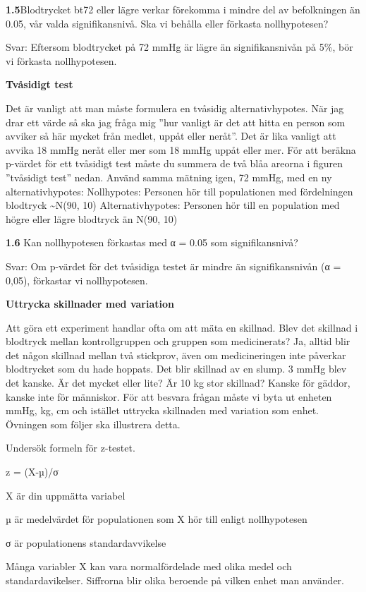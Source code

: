 \documentclass[
  letterpaper,
  DIV=11,
  numbers=noendperiod]{scrartcl}
\begin{document}
\textbf{1.5}Blodtrycket bt72 eller lägre verkar förekomma i mindre del
av befolkningen än 0.05, vår valda signifikansnivå. Ska vi behålla eller
förkasta nollhypotesen?

Svar: Eftersom blodtrycket på 72 mmHg är lägre än signifikansnivån på
5\%, bör vi förkasta nollhypotesen.

\textbf{Tvåsidigt test}

Det är vanligt att man måste formulera en tvåsidig alternativhypotes.
När jag drar ett värde så ska jag fråga mig ''hur vanligt är det att
hitta en person som avviker så här mycket från medlet, uppåt eller
neråt''. Det är lika vanligt att avvika 18 mmHg neråt eller mer som 18
mmHg uppåt eller mer. För att beräkna p-värdet för ett tvåsidigt test
måste du summera de två blåa areorna i figuren ''tvåsidigt test'' nedan.
Använd samma mätning igen, 72 mmHg, med en ny alternativhypotes:
Nollhypotes: Personen hör till populationen med fördelningen blodtryck
\textasciitilde N(90, 10) Alternativhypotes: Personen hör till en
population med högre eller lägre blodtryck än N(90, 10)

\textbf{1.6} Kan nollhypotesen förkastas med α = 0.05 som
signifikansnivå?

Svar: Om p-värdet för det tvåsidiga testet är mindre än signifikansnivån
(α = 0,05), förkastar vi nollhypotesen.

\textbf{Uttrycka skillnader med variation}

Att göra ett experiment handlar ofta om att mäta en skillnad. Blev det
skillnad i blodtryck mellan kontrollgruppen och gruppen som
medicinerats? Ja, alltid blir det någon skillnad mellan två stickprov,
även om medicineringen inte påverkar blodtrycket som du hade hoppats.
Det blir skillnad av en slump. 3 mmHg blev det kanske. Är det mycket
eller lite? Är 10 kg stor skillnad? Kanske för gäddor, kanske inte för
människor. För att besvara frågan måste vi byta ut enheten mmHg, kg, cm
och istället uttrycka skillnaden med variation som enhet. Övningen som
följer ska illustrera detta.

Undersök formeln för z-testet.

z = (X-µ)/σ

X är din uppmätta variabel

µ är medelvärdet för populationen som X hör till enligt nollhypotesen

σ är populationens standardavvikelse

Många variabler X kan vara normalfördelade med olika medel och
standardavikelser. Siffrorna blir olika beroende på vilken enhet man
använder.
\end{document}
